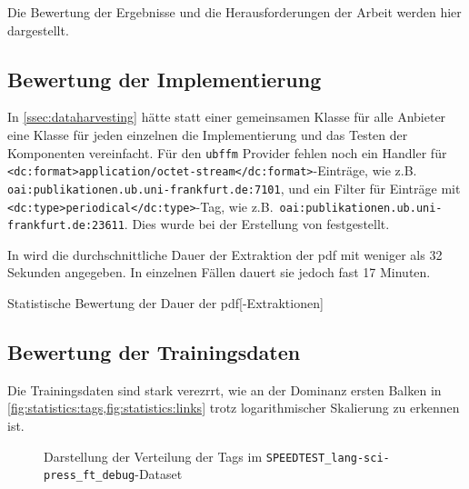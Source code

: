 Die Bewertung der Ergebnisse und die Herausforderungen der Arbeit
werden hier dargestellt.

\subsection{Bewertung der Implementierung}
\label{ssec:discussion:implementation}
In \cref{ssec:dataharvesting}
hätte statt einer gemeinsamen Klasse
für alle Anbieter
eine Klasse für jeden einzelnen die Implementierung
und das Testen der Komponenten vereinfacht.
Für den \texttt{ubffm} Provider fehlen noch ein
Handler für \texttt{<dc:format>application/octet-stream</dc:format>}-Einträge,
wie z.B.\, \texttt{oai:publikationen.ub.uni-frankfurt.de:7101},
und ein Filter für Einträge mit \texttt{<dc:type>periodical</dc:type>}-Tag,
wie z.B.\, \texttt{oai:publikationen.ub.uni-frankfurt.de:23611}.
Dies wurde bei der Erstellung von  festgestellt.

In 
wird die durchschnittliche Dauer der Extraktion der \gls{pdf}
mit weniger als 32 Sekunden angegeben.
In einzelnen Fällen dauert sie jedoch fast 17 Minuten.

\begin{table}
	\centering
	
	\caption{Statistische Bewertung der Dauer der \gls{pdf}[-Extraktionen]}
	\label{tbl:pdf_extraction:duration}
\end{table}

\subsection{Bewertung der Trainingsdaten}

Die Trainingsdaten sind stark verezrrt,
wie an der Dominanz ersten Balken in \cref{fig:statistics:tags,fig:statistics:links}
trotz logarithmischer Skalierung zu erkennen ist.

\begin{figure}
	\begin{adjustbox}{center,max width=0.9\linewidth,max totalheight=0.9\textheight}
		
	\end{adjustbox}
	\caption{Darstellung der Verteilung der Tags im \texttt{SPEEDTEST\_lang-sci-press\_ft\_debug}-Dataset}
	\label{fig:statistics:tags}
\end{figure}

